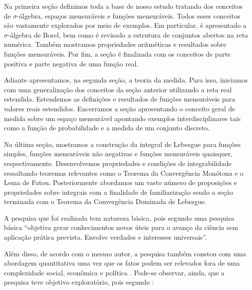   	
  	Na primeira seção definimos toda a base de nosso estudo tratando dos conceitos de $\sigma$-álgebra, espaços mensuráveis e funções mensuráveis.
  	Todos esses conceitos são vastamente explorados por meio de exemplos.
  	Em particular, é apresentado a $\sigma$-álgebra de Borel, bem como é revisado a estrutura de conjuntos abertos na reta numérica.
  	Também mostramos propriedades aritméticas e resultados sobre funções mensuráveis.
  	Por fim, a seção é finalizada com os conceitos de parte positiva e parte negativa de uma função real.
  	
  	Adiante apresentamos, na segunda seção, a teoria da medida. 
  	Para isso, iniciamos com uma generalização dos conceitos da seção anterior utilizando a reta real estendida.
  	Estendemos as definições e resultados de funções mensuráveis para valores reais estendidos.
  	Encerramos a seção apresentando o conceito geral de medida sobre um espaço mensurável apontando exemplos interdisciplinares tais como a função de probabilidade e a medida de um conjunto discreto.
  	
  	Na última seção, mostramos a construção da integral de Lebesgue para funções simples, funções mensuráveis não negativas e funções mensuráveis quaisquer, respectivamente.
  	Desenvolvemos propriedades e condições de integrabilidade ressaltando teoremas relevantes como o Teorema da Convergência Monótona e o Lema de Fatou.
  	Posteriormente abordamos um vasto número de proposições e propriedades sobre integrais com a finalidade de familiarização sendo a seção terminada com o Teorema da Convergência Dominada de Lebesgue.
  	
  
  	
  	A pesquisa que foi realizada tem natureza básica, pois segundo \cite[p.51]{profreitas} uma pesquisa básica
  	\enquote{objetiva gerar conhecimentos novos úteis para o avanço da ciência sem aplicação prática prevista. Envolve verdades e interesses universais}. 
  	
  	Além disso, de acordo com o mesmo autor, a pesquisa também constou com uma abordagem quantitativa uma vez que os fatos podem ser relevados fora de uma complexidade social, econômica e política \cite{profreitas}. 
  	Pode-se observar, ainda, que a pesquisa teve objetivo exploratório, pois segundo \citeauthor{gil}:
  	
